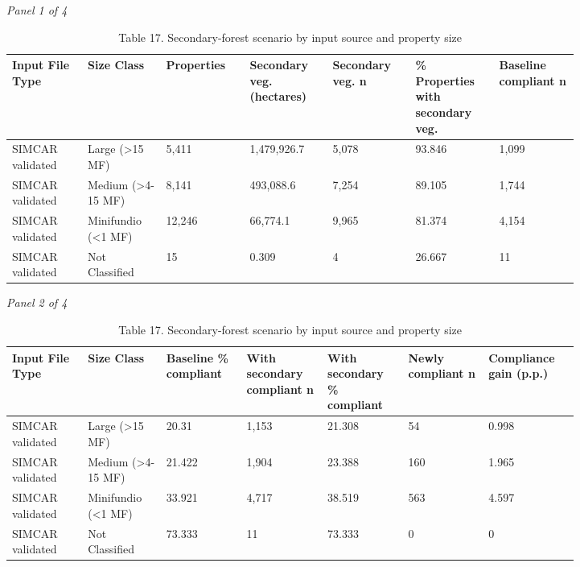 \documentclass[12pt]{article}
\begin{document}
\begin{landscape}
\begin{table}[H]
\centering
\caption{Table 17. Secondary-forest scenario by input source and property size}
\textit{Panel 1 of 4}\\[2pt]
{\fontsize{12}{14}\selectfont
\setlength{\tabcolsep}{3pt}
\renewcommand{\arraystretch}{1.08}
\begin{tabular}{p{0.117\linewidth}p{0.117\linewidth}p{0.117\linewidth}p{0.117\linewidth}p{0.117\linewidth}p{0.117\linewidth}p{0.117\linewidth}}
\toprule
Input File Type & Size Class & Properties & Secondary veg. (hectares) & Secondary veg. n & \% Properties with secondary veg. & Baseline compliant n \\
\midrule
SIMCAR validated & Large (>15 MF) & 5,411 & 1,479,926.7 & 5,078 & 93.846 & 1,099 \\
SIMCAR validated & Medium (>4-15 MF) & 8,141 & 493,088.6 & 7,254 & 89.105 & 1,744 \\
SIMCAR validated & Minifundio (<1 MF) & 12,246 & 66,774.1 & 9,965 & 81.374 & 4,154 \\
SIMCAR validated & Not Classified & 15 & 0.309 & 4 & 26.667 & 11 \\
\bottomrule
\end{tabular}
}

\vspace{0.6em}

\textit{Panel 2 of 4}\\[2pt]
{\fontsize{12}{14}\selectfont
\setlength{\tabcolsep}{3pt}
\renewcommand{\arraystretch}{1.08}
\begin{tabular}{p{0.117\linewidth}p{0.117\linewidth}p{0.117\linewidth}p{0.117\linewidth}p{0.117\linewidth}p{0.117\linewidth}p{0.117\linewidth}}
\toprule
Input File Type & Size Class & Baseline \% compliant & With secondary compliant n & With secondary \% compliant & Newly compliant n & Compliance gain (p.p.) \\
\midrule
SIMCAR validated & Large (>15 MF) & 20.31 & 1,153 & 21.308 & 54 & 0.998 \\
SIMCAR validated & Medium (>4-15 MF) & 21.422 & 1,904 & 23.388 & 160 & 1.965 \\
SIMCAR validated & Minifundio (<1 MF) & 33.921 & 4,717 & 38.519 & 563 & 4.597 \\
SIMCAR validated & Not Classified & 73.333 & 11 & 73.333 & 0 & 0 \\
\bottomrule
\end{tabular}
}

\vspace{0.6em}


\end{table}
\end{landscape}
\end{document}
